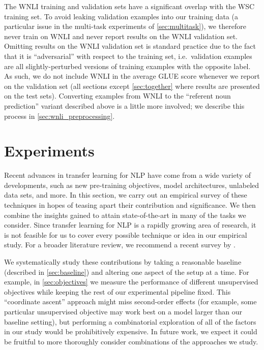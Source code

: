 \documentclass[twoside,11pt]{article}
\begin{document}
The WNLI training and validation sets have a significant overlap with the WSC training set.
To avoid leaking validation examples into our training data (a particular issue in the multi-task experiments of \cref{sec:multitask}), we therefore never train on WNLI and never report results on the WNLI validation set.
Omitting results on the WNLI validation set is standard practice \citep{devlin2018bert} due to the fact that it is ``adversarial'' with respect to the training set, i.e.\ validation examples are all slightly-perturbed versions of training examples with the opposite label.
As such, we do not include WNLI in the average GLUE score whenever we report on the validation set (all sections except \cref{sec:together} where results are presented on the test sets).
Converting examples from WNLI to the ``referent noun prediction'' variant described above is a little more involved; we describe this process in \cref{sec:wnli_preprocessing}.

\section{Experiments}
\label{sec:experiments}

Recent advances in transfer learning for NLP have come from a wide variety of developments, such as new pre-training objectives, model architectures, unlabeled data sets, and more.
In this section, we carry out an empirical survey of these techniques in hopes of teasing apart their contribution and significance.
We then combine the insights gained to attain state-of-the-art in many of the tasks we consider.
Since transfer learning for NLP is a rapidly growing area of research, it is not feasible for us to cover every possible technique or idea in our empirical study.
For a broader literature review, we recommend a recent survey by \cite{ruder2019transfer}.

We systematically study these contributions by taking a reasonable baseline (described in \cref{sec:baseline}) and altering one aspect of the setup at a time.
For example, in \cref{sec:objectives} we measure the performance of different unsupervised objectives while keeping the rest of our experimental pipeline fixed.
This ``coordinate ascent'' approach might miss second-order effects (for example, some particular unsupervised objective may work best on a model larger than our baseline setting), but performing a combinatorial exploration of all of the factors in our study would be prohibitively expensive.
In future work, we expect it could be fruitful to more thoroughly consider combinations of the approaches we study.
\end{document}
